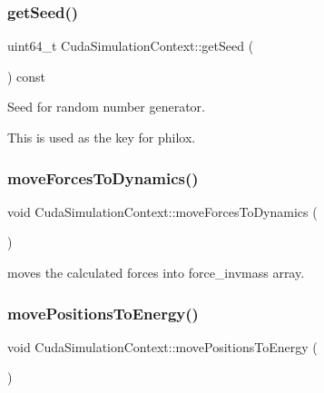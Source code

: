 \subsubsection{\texorpdfstring{get\+Seed()}{getSeed()}}
{\footnotesize\ttfamily uint64\+\_\+t Cuda\+Simulation\+Context\+::get\+Seed (\begin{DoxyParamCaption}{ }\end{DoxyParamCaption}) const\hspace{0.3cm}{\ttfamily [inline]}}



Seed for random number generator. 

This is used as the key for philox. \hypertarget{classCudaSimulationContext_af8e340b880ef23301085fc702226c609}{}\label{classCudaSimulationContext_af8e340b880ef23301085fc702226c609} 
\subsubsection{\texorpdfstring{move\+Forces\+To\+Dynamics()}{moveForcesToDynamics()}}
{\footnotesize\ttfamily void Cuda\+Simulation\+Context\+::move\+Forces\+To\+Dynamics (\begin{DoxyParamCaption}{ }\end{DoxyParamCaption})}



moves the calculated forces into force\+\_\+invmass array. 

\hypertarget{classCudaSimulationContext_a3f3e6058db0acba85a440d9417c5e7e2}{}\label{classCudaSimulationContext_a3f3e6058db0acba85a440d9417c5e7e2} 
\subsubsection{\texorpdfstring{move\+Positions\+To\+Energy()}{movePositionsToEnergy()}}
{\footnotesize\ttfamily void Cuda\+Simulation\+Context\+::move\+Positions\+To\+Energy (\begin{DoxyParamCaption}{ }\end{DoxyParamCaption})}




